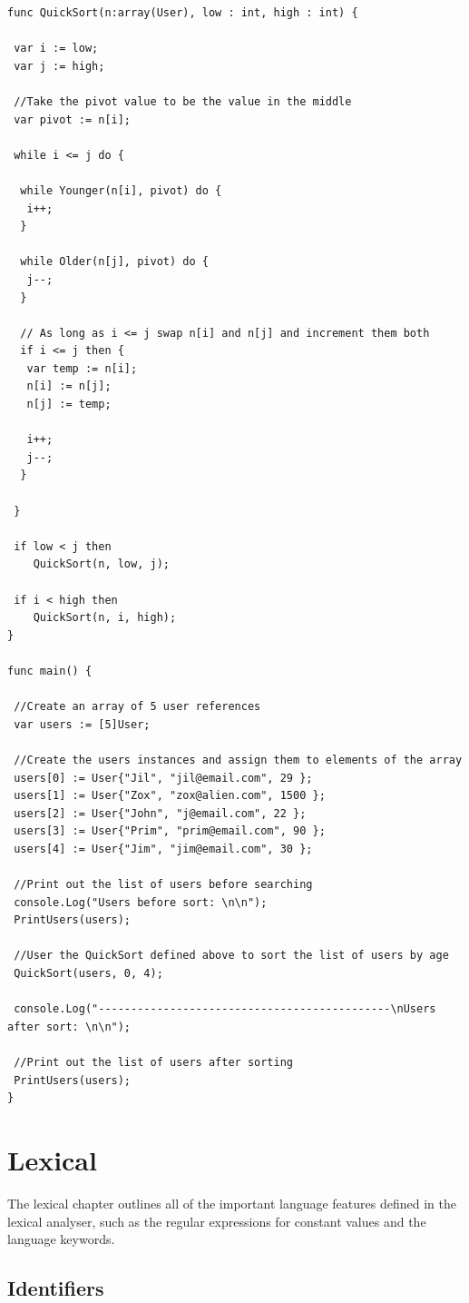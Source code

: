 \documentclass[]{final_report}
\begin{document}
\begin{verbatim}
func QuickSort(n:array(User), low : int, high : int) {

 var i := low;
 var j := high;

 //Take the pivot value to be the value in the middle
 var pivot := n[i];

 while i <= j do {

  while Younger(n[i], pivot) do {
   i++;
  }
  
  while Older(n[j], pivot) do {
   j--;
  }

  // As long as i <= j swap n[i] and n[j] and increment them both
  if i <= j then {
   var temp := n[i];
   n[i] := n[j];
   n[j] := temp;
   
   i++;
   j--;
  }

 }
 
 if low < j then 
 	QuickSort(n, low, j);
 
 if i < high then 
 	QuickSort(n, i, high);
}

func main() {

 //Create an array of 5 user references
 var users := [5]User;
 
 //Create the users instances and assign them to elements of the array
 users[0] := User{"Jil", "jil@email.com", 29 };
 users[1] := User{"Zox", "zox@alien.com", 1500 };
 users[2] := User{"John", "j@email.com", 22 };
 users[3] := User{"Prim", "prim@email.com", 90 };
 users[4] := User{"Jim", "jim@email.com", 30 };
 
 //Print out the list of users before searching
 console.Log("Users before sort: \n\n");
 PrintUsers(users);

 //User the QuickSort defined above to sort the list of users by age
 QuickSort(users, 0, 4);
 
 console.Log("---------------------------------------------\nUsers after sort: \n\n");
 
 //Print out the list of users after sorting
 PrintUsers(users);
}
\end{verbatim}

\section{Lexical}

The lexical chapter outlines all of the important language features defined in the lexical analyser, such as the regular expressions for constant values and the language keywords.

\subsection{Identifiers}
\end{document}
